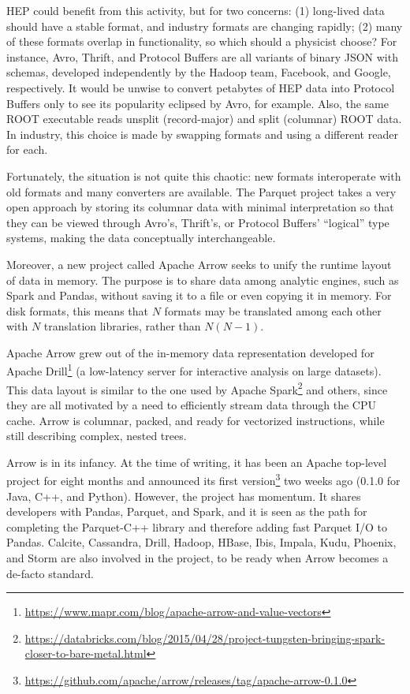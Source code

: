 \documentclass{article}
\begin{document}
HEP could benefit from this activity, but for two concerns: (1) long-lived data should have a stable format, and industry formats are changing rapidly; (2) many of these formats overlap in functionality, so which should a physicist choose? For instance, Avro, Thrift, and Protocol Buffers are all variants of binary JSON with schemas, developed independently by the Hadoop team, Facebook, and Google, respectively. It would be unwise to convert petabytes of HEP data into Protocol Buffers only to see its popularity eclipsed by Avro, for example. Also, the same ROOT executable reads unsplit (record-major) and split (columnar) ROOT data. In industry, this choice is made by swapping formats and using a different reader for each.

Fortunately, the situation is not quite this chaotic: new formats interoperate with old formats and many converters are available. The Parquet project takes a very open approach by storing its columnar data with minimal interpretation so that they can be viewed through Avro's, Thrift's, or Protocol Buffers' ``logical'' type systems, making the data conceptually interchangeable.

Moreover, a new project called Apache Arrow seeks to unify the runtime layout of data in memory. The purpose is to share data among analytic engines, such as Spark and Pandas, without saving it to a file or even copying it in memory. For disk formats, this means that $N$ formats may be translated among each other with $N$ translation libraries, rather than $N(N - 1)$.

Apache Arrow grew out of the in-memory data representation developed for Apache Drill\footnote{\url{https://www.mapr.com/blog/apache-arrow-and-value-vectors}} (a low-latency server for interactive analysis on large datasets). This data layout is similar to the one used by Apache Spark\footnote{\url{https://databricks.com/blog/2015/04/28/project-tungsten-bringing-spark-closer-to-bare-metal.html}} and others, since they are all motivated by a need to efficiently stream data through the CPU cache. Arrow is columnar, packed, and ready for vectorized instructions, while still describing complex, nested trees.

Arrow is in its infancy. At the time of writing, it has been an Apache top-level project for eight months and announced its first version\footnote{\url{https://github.com/apache/arrow/releases/tag/apache-arrow-0.1.0}} two weeks ago (0.1.0 for Java, C++, and Python). However, the project has momentum. It shares developers with Pandas, Parquet, and Spark, and it is seen as the path for completing the Parquet-C++ library and therefore adding fast Parquet I/O to Pandas. Calcite, Cassandra, Drill, Hadoop, HBase, Ibis, Impala, Kudu, Phoenix, and Storm are also involved in the project, to be ready when Arrow becomes a de-facto standard.
\end{document}
